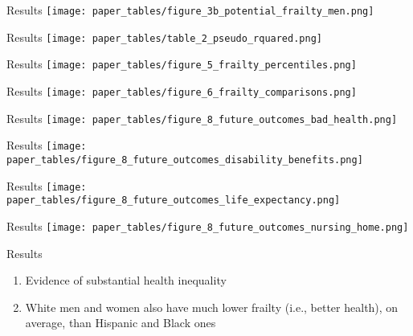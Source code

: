 \documentclass[10pt]{beamer}
\begin{document}
\begin{frame}{Results}
    \hspace*{-0.25cm}
    \texttt{[image: paper\_tables/figure\_3b\_potential\_frailty\_men.png]}
\end{frame}

\begin{frame}{Results}
    \hspace*{0.85cm}
    \texttt{[image: paper\_tables/table\_2\_pseudo\_rquared.png]}
\end{frame}

\begin{frame}{Results}
    \hspace*{0cm}
    \texttt{[image: paper\_tables/figure\_5\_frailty\_percentiles.png]}
\end{frame}

\begin{frame}{Results}
    \hspace*{0cm}
    \texttt{[image: paper\_tables/figure\_6\_frailty\_comparisons.png]}
\end{frame}

\begin{frame}{Results}
    \hspace*{0cm}
    \texttt{[image: paper\_tables/figure\_8\_future\_outcomes\_bad\_health.png]}
\end{frame}

\begin{frame}{Results}
    \hspace*{0cm}
    \texttt{[image: paper\_tables/figure\_8\_future\_outcomes\_disability\_benefits.png]}
\end{frame}

\begin{frame}{Results}
    \hspace*{0cm}
    \texttt{[image: paper\_tables/figure\_8\_future\_outcomes\_life\_expectancy.png]}
\end{frame}

\begin{frame}{Results}
    \hspace*{0cm}
    \texttt{[image: paper\_tables/figure\_8\_future\_outcomes\_nursing\_home.png]}
\end{frame}

\begin{frame}{Results}
    \begin{enumerate}
        \item Evidence of substantial health inequality \\
        \item White men and women also have much lower frailty (i.e., better health), on average, than Hispanic and Black ones
    \end{enumerate}
\end{frame}
\end{document}
